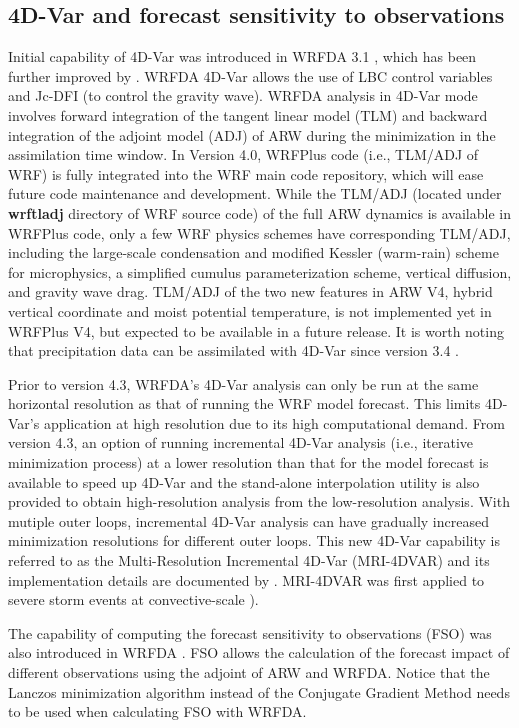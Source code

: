 \subsection{4D-Var and forecast sensitivity to observations}

Initial capability of 4D-Var was introduced in WRFDA 3.1 \citep{huang09}, which has been further
improved by \citet{zhang13, zhang14a}. WRFDA 4D-Var allows the use of LBC control variables and Jc-DFI 
(to control the gravity wave). WRFDA analysis in 4D-Var mode involves forward integration of the
tangent linear model (TLM) and backward integration of the adjoint model (ADJ) of ARW during the minimization in the assimilation time window. 
In Version 4.0, WRFPlus code (i.e., TLM/ADJ of WRF) is fully integrated into the WRF main code repository, 
which will ease future code maintenance
and development. While the TLM/ADJ (located under {\bf wrftladj} directory of WRF source code) of the full 
ARW dynamics is available in WRFPlus code, only a few WRF physics schemes have corresponding TLM/ADJ, including
the large-scale condensation and modified Kessler (warm-rain) \citep{wang13b} scheme for microphysics, a simplified
cumulus parameterization scheme, vertical diffusion, and gravity wave drag. TLM/ADJ of the two new features in ARW V4, 
hybrid vertical coordinate and moist potential temperature, is not implemented yet in WRFPlus V4, but expected to
be available in a future release.
It is worth noting that precipitation data can be assimilated with 4D-Var since version 3.4 \citep{ban17}.

Prior to version 4.3, WRFDA’s 4D-Var analysis can only be run at the same horizontal resolution as that of running the WRF model forecast. This limits 4D-Var’s application at high resolution due to its high computational demand. From version 4.3, an option of running incremental 4D-Var analysis (i.e., iterative minimization process) at a lower resolution than that for the model forecast is available to speed up 4D-Var and the stand-alone interpolation utility is also provided to obtain high-resolution analysis from the low-resolution analysis. With mutiple outer loops, incremental 4D-Var analysis can have gradually increased minimization resolutions for different outer loops. This new 4D-Var capability is referred to as the Multi-Resolution Incremental 4D-Var (MRI-4DVAR) and its implementation details are documented by \citet{liu20}. MRI-4DVAR was first applied to severe storm events at convective-scale \citep{liu20, wu20}).
 

The capability of computing the forecast sensitivity to observations (FSO) was also introduced in WRFDA \citep{zhang15}. 
FSO allows the calculation of the forecast impact of different observations using the adjoint of ARW and WRFDA. 
Notice that the Lanczos minimization algorithm instead of the Conjugate Gradient Method needs to be used when calculating FSO
with WRFDA.

